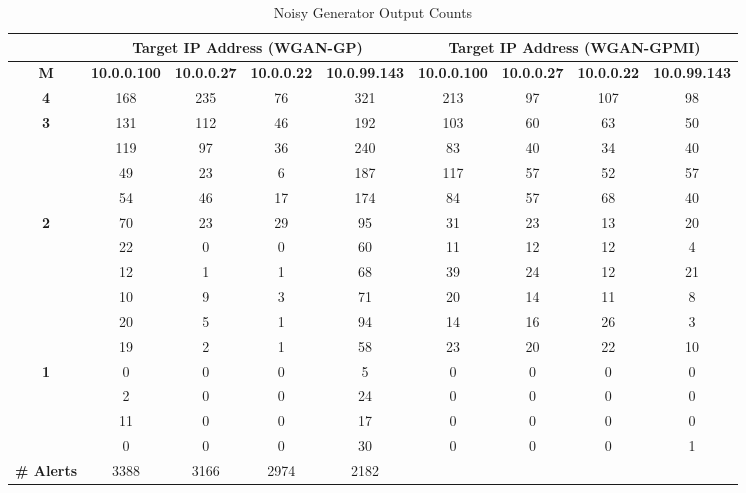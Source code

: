 \begin{table}[!htbp]
	\centering
	\caption{Noisy Generator Output Counts}
	\label{tab:random_outputs}
	\begin{adjustbox}{angle=90}
		\begin{tabular}{c|c|c|c|c|c|c|c|c}
			\multicolumn{1}{c|}{} & \multicolumn{4}{c|}{\textbf{Target IP Address (WGAN-GP)}} & \multicolumn{4}{c}{\textbf{Target IP Address (WGAN-GPMI)}} \\ \hline

			\textbf{M} & \multicolumn{1}{l|}{\textbf{10.0.0.100}} & \multicolumn{1}{l|}{\textbf{10.0.0.27}} & \multicolumn{1}{l|}{\textbf{10.0.0.22}} & \multicolumn{1}{l|}{\textbf{10.0.99.143}} & \multicolumn{1}{l|}{\textbf{10.0.0.100}} & \multicolumn{1}{l|}{\textbf{10.0.0.27}} & \multicolumn{1}{l|}{\textbf{10.0.0.22}} & \multicolumn{1}{l}{\textbf{10.0.99.143}} \\
			\hline
			\textbf{4} & 168 & 235 & 76 & 321 & 213 & 97 & 107 & 98 \\
			\hline
			\multirow{4}{*}{\textbf{3}} & 131 & 112 & 46 & 192 & 103 & 60 & 63 & 50 \\
			& 119 & 97 & 36  & 240 & 83 & 40 & 34 & 40 \\
			& 49  & 23 & 6  & 187  & 117 & 57  & 52 & 57 \\
			& 54  & 46 & 17 & 174  & 84  & 57  & 68 & 40 \\
			\hline
			\multirow{6}{*}{\textbf{2}} & 70 & 23 & 29 & 95 & 31 & 23 & 13 & 20 \\
			& 22  & 0 & 0  & 60 & 11 & 12 & 12 & 4  \\
			& 12  & 1 & 1  & 68 & 39 & 24 & 12 & 21 \\
			& 10  & 9 & 3  & 71 & 20 & 14 & 11 & 8  \\
			& 20  & 5 & 1  & 94 & 14 & 16 & 26 & 3  \\
			& 19  & 2 & 1  & 58 & 23 & 20 & 22 & 10 \\
			\hline
			\multirow{4}{*}{\textbf{1}} & 0  & 0  & 0  & 5  & 0  & 0  & 0  & 0  \\
			& 2   & 0 & 0  & 24 & 0  & 0  & 0  & 0  \\
			& 11  & 0 & 0  & 17 & 0  & 0  & 0  & 0  \\
			& 0   & 0 & 0  & 30 & 0  & 0  & 0  & 1  \\
			\hline
			\multicolumn{1}{l|}{\textbf{\# Alerts}} & \multicolumn{1}{c|}{3388} & \multicolumn{1}{c|}{3166} & \multicolumn{1}{c|}{2974} & \multicolumn{1}{c|}{2182} & \multicolumn{1}{l|}{} & \multicolumn{1}{l|}{} & \multicolumn{1}{l|}{} & \multicolumn{1}{l}{} \\

\end{tabular}
\end{adjustbox}
\end{table}
